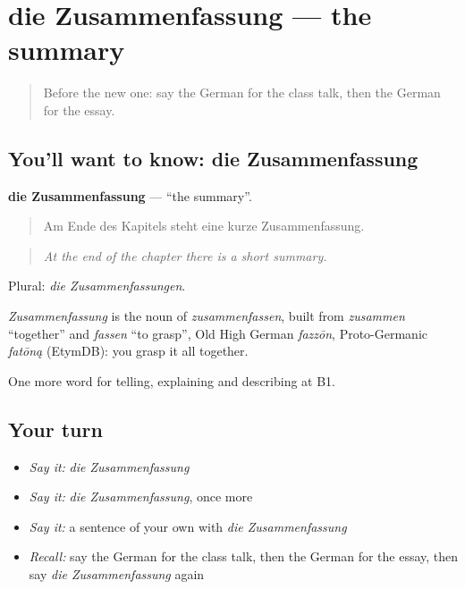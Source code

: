 \section[die Zusammenfassung]{die Zusammenfassung — the summary}

\label{lesson:GE-C378-zusammenfassung}



\begin{quote}
Before the new one: say the German for the class talk, then the German for the essay.
\end{quote}

\subsection*{You'll want to know: die Zusammenfassung}
\textbf{die Zusammenfassung} — \textquotedblleft{}the summary\textquotedblright{}.

\begin{quote}
Am Ende des Kapitels steht eine kurze Zusammenfassung.
\end{quote}

\begin{quote}
\emph{At the end of the chapter there is a short summary.}
\end{quote}

Plural: \emph{die Zusammenfassungen}.

\begin{cousinweb}
\emph{Zusammenfassung} is the noun of \emph{zusammenfassen}, built from \emph{zusammen} \textquotedblleft{}together\textquotedblright{} and \emph{fassen} \textquotedblleft{}to grasp\textquotedblright{}, Old High German \emph{fazzōn}, Proto-Germanic \emph{fatōną} (EtymDB): you grasp it all together.
\end{cousinweb}

\begin{grammarlens}[title={What you've built}]
One more word for telling, explaining and describing at B1.
\end{grammarlens}

\subsection*{Your turn}
\begin{itemize}
\raggedright
  \item \emph{Say it:} \emph{die Zusammenfassung}
  \item \emph{Say it:} \emph{die Zusammenfassung}, once more
  \item \emph{Say it:} a sentence of your own with \emph{die Zusammenfassung}
  \item \emph{Recall:} say the German for the class talk, then the German for the essay, then say \emph{die Zusammenfassung} again
\end{itemize}

